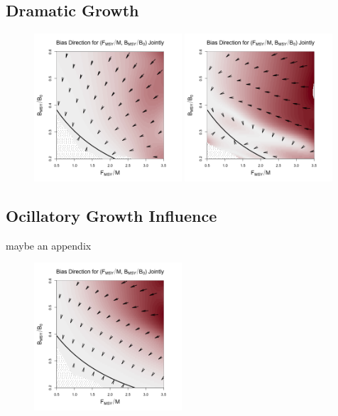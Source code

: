%
\clearpage
\subsection{Dramatic Growth}

%
\begin{figure}[h!]
\includegraphics[width=0.49\textwidth]{../ddBias/directionalBiasDDSubExpT45N150A0-1AS2K0.1.png}
\includegraphics[width=0.49\textwidth]{../ddBias/directionalBiasDDSubFlatT45N150A0-1AS2K0.1N84Edge.png}
\caption{}
\end{figure}

%
\clearpage
\subsection{Ocillatory Growth Influence\label{ocillation}}

{\color{red} maybe an appendix}

%
\begin{figure}[h!]
\includegraphics[width=0.49\textwidth]{../ddBias/directionalBiasDDSubExpT45N300A0-1AS10K0.1.png}
\caption{}
\end{figure}

